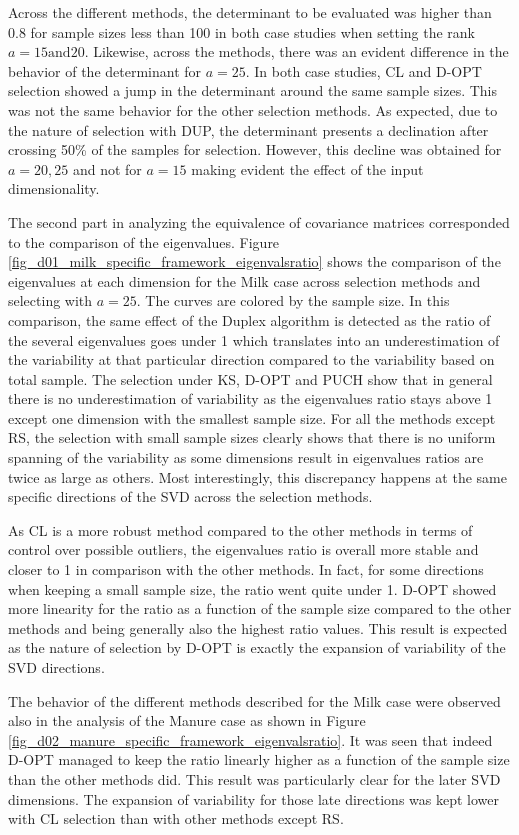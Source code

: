 \documentclass[journal=ancham,manuscript=article]{achemso}
\begin{document}
Across the different methods, the determinant to be evaluated was higher than 0.8 for sample sizes less than 100 in both case studies when setting the rank $a=15 \text{and} 20$. Likewise, across the methods, there was an evident difference in the behavior of the determinant for $a=25$. In both case studies, CL and D-OPT selection showed a jump in the determinant around the same sample sizes. This was not the same behavior for the other selection methods. As expected, due to the nature of selection with DUP, the determinant presents a declination after crossing 50\% of the samples for selection. However, this decline was obtained for $a=20, 25$ and not for $a=15$ making evident the effect of the input dimensionality.   

The second part in analyzing the equivalence of covariance matrices corresponded to the comparison of the eigenvalues. Figure \ref{fig_d01_milk_specific_framework_eigenvalsratio} shows the comparison of the eigenvalues at each dimension for the Milk case across selection methods and selecting with $a=25$. The curves are colored by the sample size. In this comparison, the same effect of the Duplex algorithm is detected as the ratio of the several eigenvalues goes under 1 which translates into an underestimation of the variability at that particular direction compared to the variability based on total sample.  The selection under KS, D-OPT and PUCH show that in general there is no underestimation of variability as the eigenvalues ratio stays above 1 except one dimension with the smallest sample size. For all the methods except RS, the selection with small sample sizes clearly shows that there is no uniform spanning of the variability as some dimensions result in eigenvalues ratios are twice as large as others. Most interestingly, this discrepancy happens at the same specific directions of the SVD across the selection methods.

As CL is a more robust method compared to the other methods in terms of control over possible outliers, the eigenvalues ratio is overall more stable and closer to 1 in comparison with the other methods. In fact, for some directions when keeping a small sample size, the ratio went quite under 1. D-OPT showed more linearity for the ratio as a function of the sample size compared to the other methods and being generally also the highest ratio values. This result is expected as the nature of selection by D-OPT is exactly the expansion of variability of the SVD directions.  

The behavior of the different methods described for the Milk case were observed also in the analysis of the Manure case as shown in Figure \ref{fig_d02_manure_specific_framework_eigenvalsratio}. It was seen that indeed D-OPT managed to keep the ratio linearly higher as a function of the sample size than the other methods did. This result was particularly clear for the later SVD dimensions. The expansion of variability for those late directions was kept lower with CL selection than with other methods except RS.  
\end{document}
